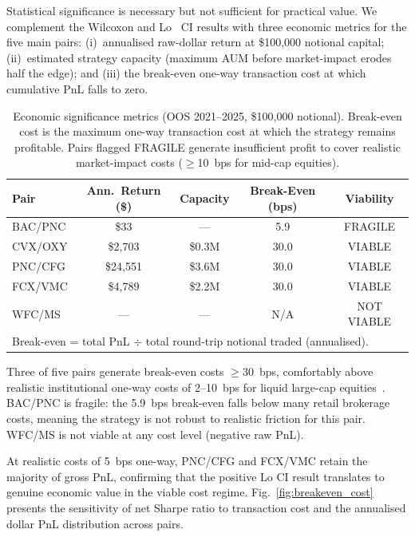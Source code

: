 \documentclass{ieeeaccess}
\begin{document}
Statistical significance is necessary but not sufficient for practical value.
We complement the Wilcoxon and Lo~\cite{lo2002statistics} CI results with three economic metrics for the five main pairs: (i)~annualised raw-dollar return at \$100{,}000 notional capital; (ii)~estimated strategy capacity (maximum AUM before market-impact erodes half the edge); and (iii) the break-even one-way transaction cost at which cumulative PnL falls to zero.

\begin{table}[h]
\centering
\caption{Economic significance metrics (OOS 2021--2025, \$100{,}000 notional). Break-even cost is the maximum one-way transaction cost at which the strategy remains profitable. Pairs flagged FRAGILE generate insufficient profit to cover realistic market-impact costs ($\geq$10~bps for mid-cap equities).}
\label{tab:economic_significance}
\small
\begin{tabular}{lcccc}
\hline
\textbf{Pair} & \textbf{Ann.\ Return (\$)} & \textbf{Capacity} & \textbf{Break-Even (bps)} & \textbf{Viability} \\
\hline
BAC/PNC & \$33    & ---       & 5.9  & FRAGILE \\
CVX/OXY & \$2,703 & \$0.3M    & 30.0 & VIABLE  \\
PNC/CFG & \$24,551 & \$3.6M   & 30.0 & VIABLE  \\
FCX/VMC & \$4,789 & \$2.2M    & 30.0 & VIABLE  \\
WFC/MS  & ---     & ---       & N/A  & NOT VIABLE \\
\hline
\multicolumn{5}{l}{\footnotesize Break-even = total PnL $\div$ total round-trip notional traded (annualised).} \\
\end{tabular}
\end{table}

Three of five pairs generate break-even costs $\geq$30~bps, comfortably above realistic institutional one-way costs of 2--10~bps for liquid large-cap equities~\cite{almgren2005direct}.
BAC/PNC is fragile: the 5.9~bps break-even falls below many retail brokerage costs, meaning the strategy is not robust to realistic friction for this pair.
WFC/MS is not viable at any cost level (negative raw PnL).

At realistic costs of 5~bps one-way, PNC/CFG and FCX/VMC retain the majority of gross PnL, confirming that the positive Lo CI result translates to genuine economic value in the viable cost regime.
Fig.~\ref{fig:breakeven_cost} presents the sensitivity of net Sharpe ratio to transaction cost and the annualised dollar PnL distribution across pairs.
\end{document}
